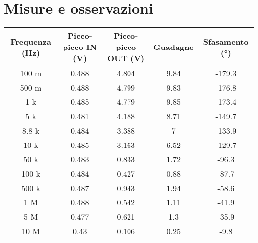 \documentclass{report}
\begin{document}
\section{Misure e osservazioni}
\begin{table}
\begin{tabular}{|c|c|c|c|c|}
		\hline
		\textbf{Frequenza (Hz)} & \textbf{Picco-picco IN (V)} & \textbf{Picco-picco OUT (V)} & \textbf{Guadagno} & \textbf{Sfasamento (°)}\\
		\hline
		100 m & 0.488 & 4.804 & 9.84 & -179.3\\
		\hline
		500 m & 0.488 & 4.799 & 9.83 & -176.8\\
		\hline
		1 k & 0.485 & 4.779 & 9.85 & -173.4\\
		\hline
		5 k & 0.481 & 4.188 & 8.71 & -149.7\\
		\hline
		8.8 k & 0.484 & 3.388 & 7 & -133.9\\
		\hline
		10 k & 0.485 & 3.163 & 6.52 & -129.7\\
		\hline
		50 k & 0.483 & 0.833 & 1.72 & -96.3\\
		\hline
		100 k & 0.484 & 0.427 & 0.88 & -87.7\\
		\hline
		500 k & 0.487 & 0.943 & 1.94 & -58.6\\
		\hline
		1 M & 0.488 & 0.542 & 1.11 & -41.9\\
		\hline
		5 M & 0.477 & 0.621 & 1.3 & -35.9\\
		\hline
		10 M & 0.43 & 0.106 & 0.25 & -9.8\\
		\hline
	\end{tabular}
\end{table}


\end{document}
